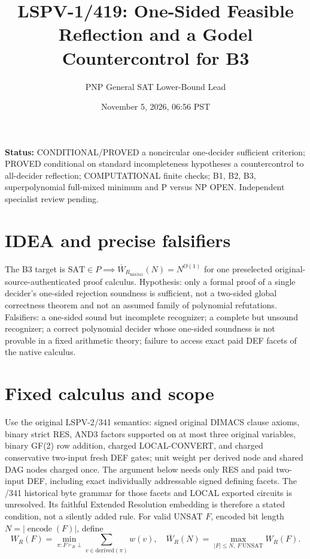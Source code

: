 \documentclass[11pt]{article}
\title{LSPV-1/419: One-Sided Feasible Reflection and a Godel Countercontrol for B3}
\author{PNP General SAT Lower-Bound Lead}
\date{November 5, 2026, 06:56 PST}
\begin{document}
\maketitle
\noindent\textbf{Status:} CONDITIONAL/PROVED a noncircular one-decider sufficient criterion; PROVED conditional on standard incompleteness hypotheses a countercontrol to all-decider reflection; COMPUTATIONAL finite checks; B1, B2, B3, superpolynomial full-mixed minimum and P versus NP OPEN. Independent specialist review pending.

\section{IDEA and precise falsifiers}
The B3 target is $\mathrm{SAT}\in P\implies \overline W_{R_{\mathrm{mix341}}}(N)=N^{O(1)}$ for one preselected original-source-authenticated proof calculus. Hypothesis: only a formal proof of a single decider's one-sided rejection soundness is sufficient, not a two-sided global correctness theorem and not an assumed family of polynomial refutations. Falsifiers: a one-sided sound but incomplete recognizer; a complete but unsound recognizer; a correct polynomial decider whose one-sided soundness is not provable in a fixed arithmetic theory; failure to access exact paid DEF facets of the native calculus.

\section{Fixed calculus and scope}
Use the original LSPV-2/341 semantics: signed original DIMACS clause axioms, binary strict RES, AND3 factors supported on at most three original variables, binary GF(2) row addition, charged LOCAL-CONVERT, and charged conservative two-input fresh DEF gates; unit weight per derived node and shared DAG nodes charged once. The argument below needs only RES and paid two-input DEF, including exact individually addressable signed defining facets. The /341 historical byte grammar for those facets and LOCAL exported circuits is unresolved. Its faithful Extended Resolution embedding is therefore a stated condition, not a silently added rule. For valid UNSAT $F$, encoded bit length $N=|\operatorname{encode}(F)|$, define
\[
W_R(F)=\min_{\pi:F\vdash_R\bot}\sum_{v\in\mathrm{derived}(\pi)}w(v),\quad
\overline W_R(N)=\max_{|F|\le N,\ F\ \mathrm{UNSAT}}W_R(F).
\]
\end{document}
